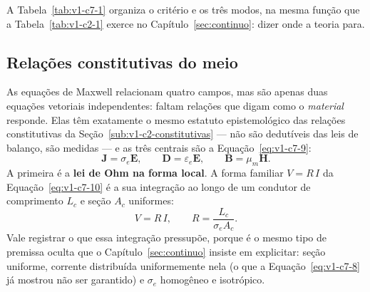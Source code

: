 \documentclass[12pt,a4paper]{article}
\numberwithin{equation}{section}
\numberwithin{table}{section}
\numberwithin{figure}{section}
\begin{document}
A Tabela~\ref{tab:v1-c7-1} organiza o critério e os três modos, na mesma
função que a Tabela~\ref{tab:v1-c2-1} exerce no Capítulo~\ref{sec:continuo}:
dizer onde a teoria para.

\begin{table}[H]
\centering
\caption[Validade da hipótese de parâmetros concentrados]{Hipótese de
parâmetros concentrados: critério de validade e modos de falha relevantes em
acionamento por inversor.}
\label{tab:v1-c7-1}
\small
{}
\end{table}

\subsection{Relações constitutivas do meio}\label{sub:v1-c7-constitutivas}

As equações de Maxwell relacionam quatro campos, mas são apenas duas equações
vetoriais independentes: faltam relações que digam como o \emph{material}
responde. Elas têm exatamente o mesmo estatuto epistemológico das relações
constitutivas da Seção~\ref{sub:v1-c2-constitutivas} --- não são dedutíveis das
leis de balanço, são medidas --- e as três centrais são a
Equação~\eqref{eq:v1-c7-9}:
\begin{equation}\label{eq:v1-c7-9}
\mathbf{J} = \sigma_e\mathbf{E},
\qquad
\mathbf{D} = \varepsilon_e\mathbf{E},
\qquad
\mathbf{B} = \mu_m\mathbf{H} .
\end{equation}
A primeira é a \textbf{lei de Ohm na forma local}. A forma familiar
$V = R\,I$ da Equação~\eqref{eq:v1-c7-10} é a sua integração ao longo de um
condutor de comprimento $L_c$ e seção $A_c$ uniformes:
\begin{equation}\label{eq:v1-c7-10}
V = R\,I,
\qquad
R = \frac{L_c}{\sigma_e A_c} .
\end{equation}
Vale registrar o que essa integração pressupõe, porque é o mesmo tipo de
premissa oculta que o Capítulo~\ref{sec:continuo} insiste em explicitar:
seção uniforme, corrente distribuída uniformemente nela (o que a
Equação~\eqref{eq:v1-c7-8} já mostrou não ser garantido) e $\sigma_e$
homogêneo e isotrópico.
\end{document}
